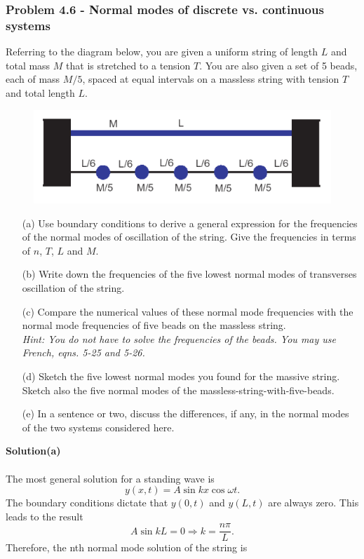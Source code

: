 \documentclass[12pt,a4paper]{article}
\begin{document}
\subsubsection*{Problem 4.6 - Normal modes of discrete vs. continuous systems}
Referring to the diagram below, you are given a uniform string of length $L$ and total mass $M$ that is stretched to a tension $T$. You are also given a set of 5 beads, each of mass $M/5$, spaced at equal intervals on a massless string with tension $T$ and total length $L$.
\begin{figure}[h]
    \centering
    \includegraphics[width=0.6\linewidth]{figs/fig_prob_4.6.png}
\end{figure}
\begin{enumerate}
    \item[(a)]Use boundary conditions to derive a general expression for the frequencies of the normal modes of oscillation of the string. Give the frequencies in terms of $n$, $T$, $L$ and $M$.
    \item[(b)]Write down the frequencies of the five lowest normal modes of transverses oscillation of the string.
    \item[(c)]Compare the numerical values of these normal mode frequencies with the normal mode frequencies of five beads on the massless string.
    \\\textit{Hint: You do not have to solve the frequencies of the beads. You may use French, eqns. 5-25 and 5-26.}
    \item[(d)]Sketch the five lowest normal modes you found for the massive string. Sketch also the five normal modes of the massless-string-with-five-beads.
    \item[(e)]In a sentence or two, discuss the differences, if any, in the normal modes of the two systems considered here.
\end{enumerate}
\textbf{Solution(a)}
\\
\\The most general solution for a standing wave is
\[y(x,t)=A\sin kx\cos\omega t.\]
The boundary conditions dictate that $y(0,t)$ and $y(L,t)$ are always zero. This leads to the result
\[A\sin kL=0\Rightarrow k=\frac{n\pi}{L}.\]
Therefore, the nth normal mode solution of the string is
\end{document}
